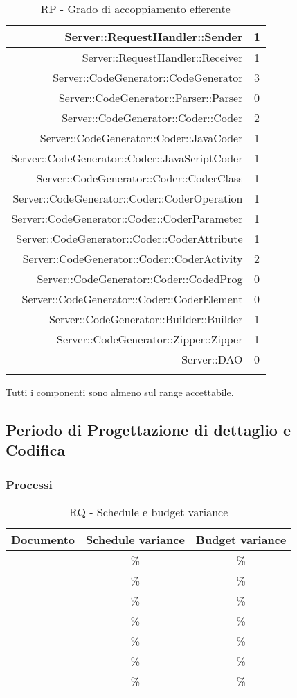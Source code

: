 \documentclass[../PianoDiQualifica.tex]{subfiles}
\begin{document}
\begin{longtable}{|r|c|}
					Server::RequestHandler::Sender & 1 \\ \hline
					Server::RequestHandler::Receiver & 1 \\ \hline
					Server::CodeGenerator::CodeGenerator & 3 \\ \hline
					Server::CodeGenerator::Parser::Parser & 0 \\ \hline
					Server::CodeGenerator::Coder::Coder & 2 \\ \hline
					Server::CodeGenerator::Coder::JavaCoder & 1\\ \hline
					Server::CodeGenerator::Coder::JavaScriptCoder & 1\\ \hline
					Server::CodeGenerator::Coder::CoderClass & 1\\ \hline
					Server::CodeGenerator::Coder::CoderOperation & 1\\ \hline
					Server::CodeGenerator::Coder::CoderParameter & 1\\ \hline
					Server::CodeGenerator::Coder::CoderAttribute & 1\\ \hline
					Server::CodeGenerator::Coder::CoderActivity & 2\\ \hline
					Server::CodeGenerator::Coder::CodedProg & 0\\ \hline
					Server::CodeGenerator::Coder::CoderElement & 0\\ \hline
					Server::CodeGenerator::Builder::Builder & 1 \\ \hline
					Server::CodeGenerator::Zipper::Zipper & 1 \\ \hline
					Server::DAO & 0 \\ \hline
				\caption{RP - Grado di accoppiamento efferente}
				\end{longtable}
				Tutti i componenti sono almeno sul range accettabile.
			\subsection{Periodo di Progettazione di dettaglio e Codifica}
				\subsubsection{Processi}
					\begin{table}[H]
					\center
						\begin{tabular}{|l|c|c|}
							\hline
							\rowcolor{blue!30}\textbf{Documento} & \textbf{Schedule variance} & \textbf{Budget variance} \\ \hline
							\analisideirequisitiRQ & \% & \% \\ \hline
							\glossarioRQ & \% & \% \\ \hline
							\normediprogettoRQ & \% & \% \\ \hline
							\pianodiprogettoRQ & \% & \% \\ \hline
							\pianodiqualificaRQ & \% & \% \\ \hline
							\specificatecnicaRQ & \% & \% \\ \hline
							 & \% & \% \\ \hline
						\end{tabular}
					\caption{RQ - Schedule e budget variance}
					\end{table}
\end{document}
